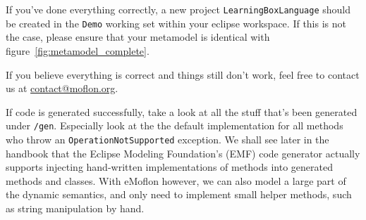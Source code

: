 If you've done everything correctly, a new project \texttt{LearningBoxLanguage} should be created in the \texttt{Demo} working set within your eclipse
workspace. If this is not the case, please ensure that your metamodel is identical with figure~\ref{fig:metamodel_complete}.

If you believe everything is correct and things still don't work, feel free to contact us at \href{mailto:contact@moflon.org}{contact@moflon.org}.

If code is generated successfully, take a look at all the stuff that's been generated under \texttt{/gen}. Especially look at the the default implementation for
all methods who throw an  \texttt{OperationNotSupported} exception. We shall see later in the handbook that the Eclipse Modeling Foundation's (EMF) code
generator actually supports injecting hand-written implementations of methods into generated methods and classes. With eMoflon however, we can also model a
large part of the dynamic semantics, and only need to implement small helper methods, such as string manipulation by hand.

